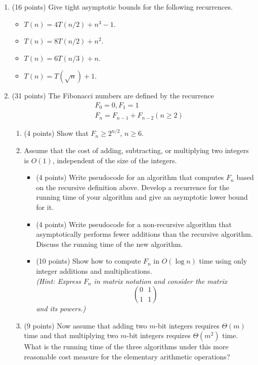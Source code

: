 \documentclass[11pt]{article}
\begin{document}
\begin{enumerate}
\newpage
\item (16 points) Give tight asymptotic bounds for the following recurrences.
\begin{itemize}
\item $T(n) = 4T(n/2)  + n^3 -1$.
\item $T(n) = 8T(n/2) + n^2$.
\item $T(n) = 6T(n/3) + n$.
\item  $T(n) = T(\sqrt{n})  + 1$.
\end{itemize}

\bigskip


\item (31 points) The Fibonacci numbers are defined by the recurrence 
\begin{eqnarray}
&& F_0 =  0, F_1=1 \nonumber \\
&& F_n =  F_{n-1} + F_{n-2}  (n \geq 2) \nonumber 
\end{eqnarray}
\begin{enumerate}
\item (4 points) Show that $F_n \geq 2^{n/2}$, $n \geq 6$. 
\item  Assume that the cost of adding, subtracting, or multiplying two integers is $O(1)$, independent 
of the size of the integers.  
\begin{itemize}
\item (4 points) Write pseudocode for an algorithm that computes $F_n$ based on the recursive definition above. 
Develop a recurrence for the running time of your algorithm and 
give an asymptotic lower bound for it.
\item (4 points) Write pseudocode for a non-recursive algorithm that asymptotically performs fewer
additions than the recursive algorithm. Discuss the running time of the new algorithm. 
\item (10 points) Show how to compute $F_n$ in $O(\log{n})$ time 
using only integer additions and multiplications. \\
{\em (Hint: Express $F_n$ in matrix notation
and consider the matrix $${0 \ \ \ 1} \choose {1\ \ \  1} $$
 and its powers.)}
\end{itemize}

\item (9 points) Now assume that adding two $m$-bit integers requires $\Theta(m)$ time and that multiplying 
two $m$-bit integers requires $\Theta( m^2 )$ time. What is the running time of the three
algorithms under this more reasonable cost measure for the elementary arithmetic operations?
\end{enumerate}




\end{enumerate}
\end{document}
